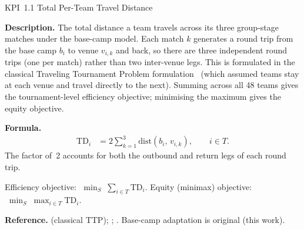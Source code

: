 \documentclass[12pt, letterpaper]{article}
\newcommand{\kpilabel}[1]{\noindent\textbf{#1}\enspace}
\begin{document}
\begin{kpibox}{KPI~1.1 \textendash{} Total Per-Team Travel Distance}

\kpilabel{Description.}
The total distance a team travels across its three group-stage matches
under the base-camp model.  Each match $k$ generates a round trip from
the base camp $b_i$ to venue $v_{i,k}$ and back, so there are three
independent round trips (one per match) rather than two inter-venue legs.
This is formulated in the classical Traveling Tournament Problem
formulation~\citep{Easton2001} (which assumed teams stay at each venue
and travel directly to the next).  Summing across all 48 teams gives the
tournament-level efficiency objective; minimising the maximum gives the
equity objective.

\medskip
\kpilabel{Formula.}
\begin{align*}
  \mathrm{TD}_i &= 2\sum_{k=1}^{3} \mathrm{dist}(b_i,\, v_{i,k}),
  \qquad i \in T.
\end{align*}
The factor of~2 accounts for both the outbound and return legs of each
round trip.

\medskip\noindent
Efficiency objective: $\;\displaystyle\min_{S}\;\sum_{i \in T}
\mathrm{TD}_i$.
\quad
Equity (minimax) objective: $\;\displaystyle\min_{S}\;\max_{i \in T}
\mathrm{TD}_i$.

\medskip
\kpilabel{Reference.}
\citet{Easton2001} (classical TTP); \citet{GuajardoEtAl2026};
\citet{SITravel2026}.  Base-camp adaptation is original (this work).
\end{kpibox}
\end{document}
